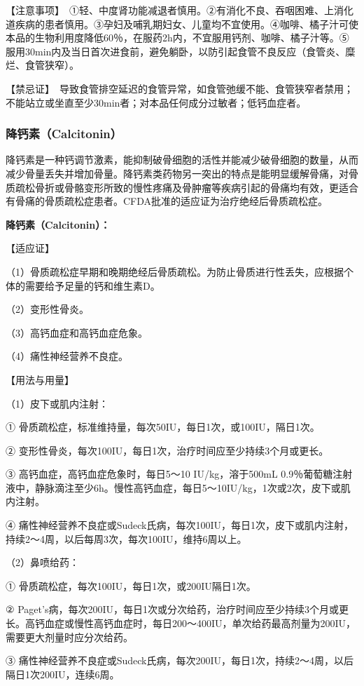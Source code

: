 【注意事项】　①轻、中度肾功能减退者慎用。②有消化不良、吞咽困难、上消化道疾病的患者慎用。③孕妇及哺乳期妇女、儿童均不宜使用。④咖啡、橘子汁可使本品的生物利用度降低60％，在服药2h内，不宜服用钙剂、咖啡、橘子汁等。⑤服用30min内及当日首次进食前，避免躺卧，以防引起食管不良反应（食管炎、糜烂、食管狭窄）。

【禁忌证】　导致食管排空延迟的食管异常，如食管弛缓不能、食管狭窄者禁用；不能站立或坐直至少30min者；对本品任何成分过敏者；低钙血症者。

\subsubsection{降钙素（Calcitonin）}

降钙素是一种钙调节激素，能抑制破骨细胞的活性并能减少破骨细胞的数量，从而减少骨量丢失并增加骨量。降钙素类药物另一突出的特点是能明显缓解骨痛，对骨质疏松骨折或骨骼变形所致的慢性疼痛及骨肿瘤等疾病引起的骨痛均有效，更适合有骨痛的骨质疏松症患者。CFDA批准的适应证为治疗绝经后骨质疏松症。

\textbf{降钙素（Calcitonin）：}

【适应证】

（1）骨质疏松症早期和晚期绝经后骨质疏松。为防止骨质进行性丢失，应根据个体的需要给予足量的钙和维生素D。

（2）变形性骨炎。

（3）高钙血症和高钙血症危象。

（4）痛性神经营养不良症。

【用法与用量】

（1）皮下或肌内注射：

① 骨质疏松症，标准维持量，每次50IU，每日1次，或100IU，隔日1次。

② 变形性骨炎，每次100IU，每日1次，治疗时间应至少持续3个月或更长。

③ 高钙血症，高钙血症危象时，每日5～10 IU/kg，溶于500mL
0.9％葡萄糖注射液中，静脉滴注至少6h。慢性高钙血症，每日5～10IU/kg，1次或2次，皮下或肌内注射。

④
痛性神经营养不良症或Sudeck氏病，每次100IU，每日1次，皮下或肌内注射，持续2～4周，以后每周3次，每次100IU，维持6周以上。

（2）鼻喷给药：

① 骨质疏松症，每次100IU，每日1次，或200IU隔日1次。

②
Paget's病，每次200IU，每日1次或分次给药，治疗时间应至少持续3个月或更长。高钙血症或慢性高钙血症时，每日200～400IU，单次给药最高剂量为200IU，需要更大剂量时应分次给药。

③
痛性神经营养不良症或Sudeck氏病，每次200IU，每日1次，持续2～4周，以后隔日1次200IU，连续6周。

